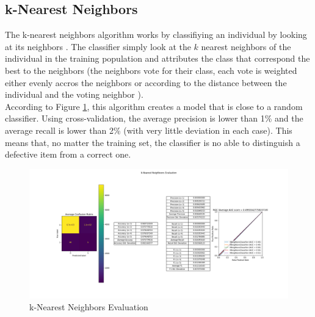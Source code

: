 \subsection{k-Nearest Neighbors}
The k-nearest neighbors algorithm works by classifiying an individual by
looking at its neighbors \cite{knn_wikipedia}. The classifier simply look at
the \(k\) nearest neighbors of the individual in the training population and
attributes the class that correspond the best to the neighbors (the neighbors
vote for their class, each vote is weighted either evenly accros the neighbors
or according to the distance between the individual and the voting neighbor
\cite{knn_scikit}).\\


According to Figure \ref{knn}, this algorithm creates a model that is close to
a random classifier. Using cross-validation, the average precision is lower
than 1\% and the average recall is lower than 2\% (with very little deviation
in each case). This means that, no matter the training set, the classifier is
no able to distinguish a defective item from a correct one.\\

\begin{figure}
    \center
    \includegraphics[scale=0.32]{img/knn_d.png}
    \caption{k-Nearest Neighbors Evaluation}
    \label{knn}
\end{figure}

